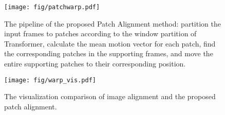 \documentclass{article}
\begin{document}
\begin{figure}[t]
    \centering
    \texttt{[image: fig/patchwarp.pdf]}
\caption{The pipeline of the proposed Patch Alignment method:
     partition the input frames to patches according to the window partition of Transformer,
     calculate the mean motion vector for each patch,
     find the corresponding patches in the supporting frames, and
     move the entire supporting patches to their corresponding position.}
    \label{fig:patch-warp}
    \vspace{-2mm}
\end{figure}

\begin{figure}[t]
    \centering
    \texttt{[image: fig/warp\_vis.pdf]}
    \vspace{-5mm}
    \caption{The visualization comparison of image alignment and the proposed patch alignment.}
    \label{fig:patch-vis}
    \vspace{-5mm}
\end{figure}

\begin{table}[t]
    \centering
    \hfill
{}
    \vspace{-3mm}
\end{table}
\end{document}
